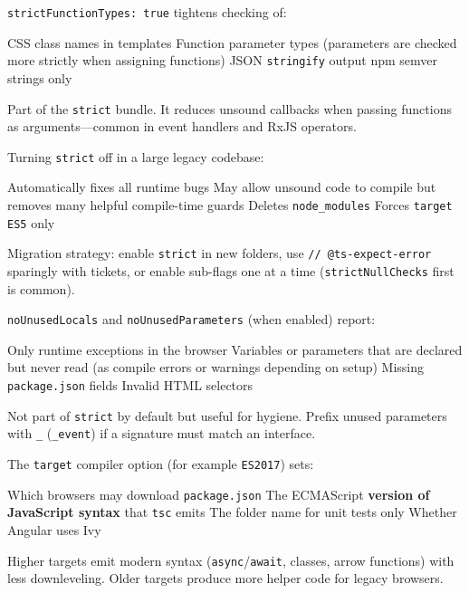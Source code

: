 \question[4]
\texttt{strictFunctionTypes: true} tightens checking of:
\begin{choices}
  \choice CSS class names in templates
  \CorrectChoice Function parameter types (parameters are checked more strictly when assigning functions)
  \choice JSON \texttt{stringify} output
  \choice npm semver strings only
\end{choices}
\begin{solution}
  Part of the \texttt{strict} bundle. It reduces unsound callbacks when passing functions as arguments---common in event handlers and RxJS operators.
\end{solution}

\question[4]
Turning \texttt{strict} off in a large legacy codebase:
\begin{choices}
  \choice Automatically fixes all runtime bugs
  \CorrectChoice May allow unsound code to compile but removes many helpful compile-time guards
  \choice Deletes \texttt{node\_modules}
  \choice Forces \texttt{target ES5} only
\end{choices}
\begin{solution}
  Migration strategy: enable \texttt{strict} in new folders, use \texttt{// @ts-expect-error} sparingly with tickets, or enable sub-flags one at a time (\texttt{strictNullChecks} first is common).
\end{solution}

\question[4]
\texttt{noUnusedLocals} and \texttt{noUnusedParameters} (when enabled) report:
\begin{choices}
  \choice Only runtime exceptions in the browser
  \CorrectChoice Variables or parameters that are declared but never read (as compile errors or warnings depending on setup)
  \choice Missing \texttt{package.json} fields
  \choice Invalid HTML selectors
\end{choices}
\begin{solution}
  Not part of \texttt{strict} by default but useful for hygiene. Prefix unused parameters with \lstinline[style=tsinline]|_| (\lstinline[style=tsinline]|_event|) if a signature must match an interface.
\end{solution}

\question[4]
The \texttt{target} compiler option (for example \texttt{ES2017}) sets:
\begin{choices}
  \choice Which browsers may download \texttt{package.json}
  \CorrectChoice The ECMAScript \textbf{version of JavaScript syntax} that \texttt{tsc} emits
  \choice The folder name for unit tests only
  \choice Whether Angular uses Ivy
\end{choices}
\begin{solution}
  Higher targets emit modern syntax (\texttt{async}/\texttt{await}, classes, arrow functions) with less downleveling. Older targets produce more helper code for legacy browsers.
\end{solution}

